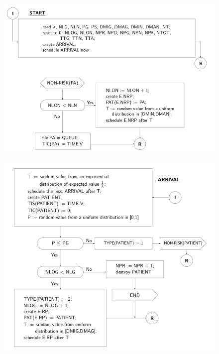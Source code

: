 \documentclass[11pt]{book}
\begin{document}
\begin{figure}[H]
  \centering
  \includegraphics[width=\textwidth]{images/cap11fig40.png}
\end{figure}

\begin{figure}[H]
  \centering
  \includegraphics[width=\textwidth]{images/cap11fig41.png}
\end{figure}
\end{document}
